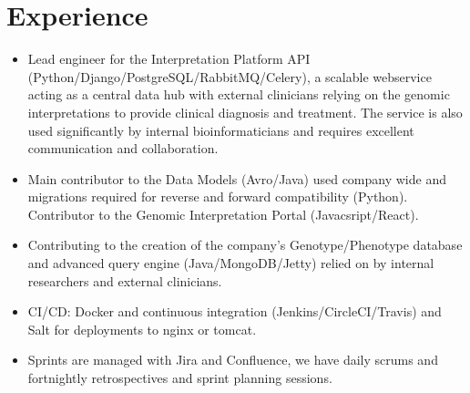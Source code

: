 \documentclass[11pt,a4paper,sans]{moderncv}        %
\begin{document}
\section{Experience}
{
\begin{itemize}%
\item Lead engineer for the Interpretation Platform API (Python/Django/PostgreSQL/RabbitMQ/Celery), a scalable webservice acting as a central data hub 
with external clinicians relying on the genomic interpretations to provide clinical diagnosis and treatment. The service is also used significantly by internal bioinformaticians and requires excellent communication and collaboration.
\item Main contributor to the Data Models (Avro/Java) used company wide and migrations required for reverse and forward compatibility (Python). Contributor to the Genomic Interpretation Portal (Javacsript/React).
\item Contributing to the creation of the company's Genotype/Phenotype database and advanced query engine (Java/MongoDB/Jetty) relied on by internal researchers and external clinicians.
\item CI/CD: Docker and continuous integration (Jenkins/CircleCI/Travis) and Salt for deployments  to nginx or tomcat.
\item Sprints are managed with Jira and Confluence, we have daily scrums and fortnightly retrospectives and sprint planning sessions.
\end{itemize}
}
\end{document}
